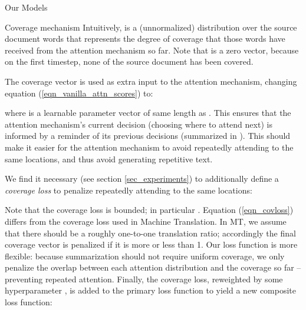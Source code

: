 \documentclass[11pt,a4paper]{article}
\begin{document}
\begin{section}{Our Models}
\begin{subsection}{Coverage mechanism}
Intuitively,  is a (unnormalized) distribution over the source document words that represents the degree of coverage that those words have received from the attention mechanism so far.
Note that  is a zero vector, because on the first timestep, none of the source document has been covered.

The coverage vector is used as extra input to the attention mechanism, changing equation (\ref{eqn_vanilla_attn_scores}) to:

where  is a learnable parameter vector of same length as .
This ensures that the attention mechanism's current decision (choosing where to attend next) is informed by a reminder of its previous decisions (summarized in ).
This should make it easier for the attention mechanism to avoid repeatedly attending to the same locations, and thus avoid generating repetitive text.

We find it necessary (see section \ref{sec_experiments}) to additionally define a \textit{coverage loss} to penalize repeatedly attending to the same locations:

Note that the coverage loss is bounded; in particular .
Equation (\ref{eqn_covloss}) differs from the coverage loss used in Machine Translation.
In MT, we assume that there should be a roughly one-to-one translation ratio; accordingly the final coverage vector is penalized if it is more or less than 1.
Our loss function is more flexible: because summarization should not require uniform coverage, we only penalize the overlap between each attention distribution and the coverage so far -- preventing repeated attention.
Finally, the coverage loss, reweighted by some hyperparameter , is added to the primary loss function to yield a new composite loss function:

\end{subsection}
\end{section} 
\end{document}
